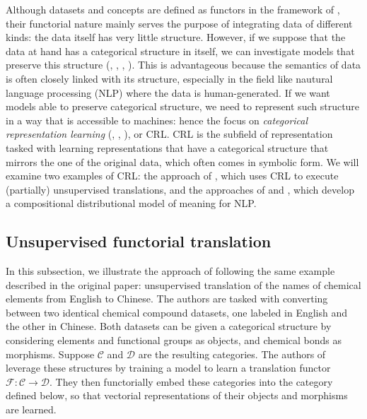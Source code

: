 \documentclass[11pt,a4paper,openright,twoside]{report}
\theoremstyle{plain}
\theoremstyle{definition}
\begin{document}
Although datasets and concepts are defined as functors in the framework of \cite{gavranovic2019compositional}, their functorial nature mainly serves the purpose of integrating data of different kinds: the data itself has very little structure. However, if we suppose that the data at hand has a categorical structure in itself, we can investigate models that preserve this structure (\cite{coecke2010mathematical}, \cite{lewis2019compositionality}, \cite{sheshmani2021categorical}, \cite{chytas2024poolingimagedatasetsmultiple}). This is advantageous because the semantics of data is often closely linked with its structure, especially in the field like nautural language processing (NLP) where the data is human-generated. If we want models able to preserve categorical structure, we need to represent such structure in a way that is accessible to machines: hence the focus on \textit{categorical representation learning} (\cite{coecke2010mathematical}, \cite{lewis2019compositionality}, \cite{sheshmani2021categorical}), or CRL. CRL is the subfield of representation tasked with learning representations that have a categorical structure that mirrors the one of the original data, which often comes in symbolic form. We will examine two examples of CRL: the approach of \cite{sheshmani2021categorical}, which uses CRL to execute (partially) unsupervised translations, and the approaches of \cite{coecke2010mathematical} and \cite{lewis2019compositionality}, which develop a compositional distributional model of meaning for NLP.




\subsection{Unsupervised functorial translation}


In this subsection, we illustrate the approach of \cite{sheshmani2021categorical} following the same example described in the original paper: unsupervised translation of the names of chemical elements from English to Chinese. The authors are tasked with converting between two identical chemical compound datasets, one labeled in English and the other in Chinese. Both datasets can be given a categorical structure by considering elements and functional groups as objects, and chemical bonds as morphisms. Suppose $\mathcal{C}$ and $\mathcal{D}$ are the resulting categories. The authors of \cite{sheshmani2021categorical} leverage these structures by training a model to learn a translation functor $\mathcal{F}: \mathcal{C} \to \mathcal{D}$. They then functorially embed these categories into the category defined below, so that vectorial representations of their objects and morphisms are learned.
\end{document}
